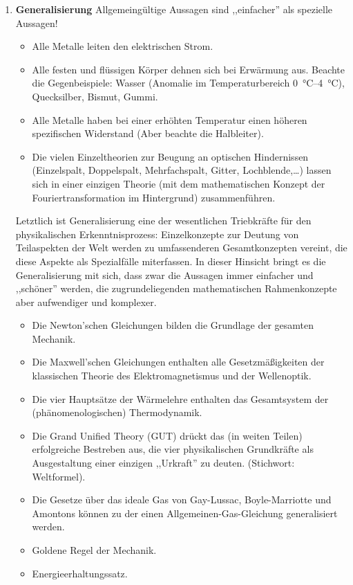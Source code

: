 \begin{enumerate}
	
	\item \textbf{Generalisierung}
	Allgemeing\"{u}ltige Aussagen sind ,,einfacher'' als spezielle Aussagen!
	
	\mip
	\begin{beisp}
	\begin{itemize}
		\item Alle Metalle leiten den elektrischen Strom.
		\item Alle festen und fl\"{u}ssigen K\"{o}rper dehnen sich bei Erw\"{a}rmung aus.
		\nip
		Beachte die Gegenbeispiele: Wasser (Anomalie im Temperaturbereich
		\SIrange{0}{4}{\celsius}), Quecksilber, Bismut, Gummi.
		\item Alle Metalle haben bei einer erh\"{o}hten Temperatur einen h\"{o}heren
		spezifischen Widerstand (Aber beachte die Halbleiter).
		\item
		Die vielen Einzeltheorien zur Beugung an optischen
		Hindernissen (Einzelspalt, Doppelspalt, Mehrfachspalt, Gitter,
		Lochblende,\dots) lassen sich in einer einzigen Theorie
		(mit dem mathematischen Konzept der Fouriertransformation
		im Hintergrund) zusammenf\"{u}hren.
	\end{itemize}
	\end{beisp}

	
	Letztlich ist Generalisierung eine der wesentlichen Triebkr\"{a}fte
	f\"{u}r den physikalischen Erkenntnisprozess: Einzelkonzepte zur Deutung
	von Teilaspekten der Welt werden zu umfassenderen Gesamtkonzepten
	vereint, die diese Aspekte als Spezialf\"{a}lle miterfassen.
	In dieser Hinsicht bringt es die Generalisierung mit sich,
	dass zwar die Aussagen immer einfacher und ,,sch\"{o}ner'' werden,
	die zugrundeliegenden mathematischen Rahmenkonzepte aber
	aufwendiger und komplexer.
	
	\mip
	\begin{beisp}
	\begin{itemize}
		\item Die Newton'schen Gleichungen bilden die Grundlage der gesamten
		Mechanik.
		\item Die Maxwell'schen Gleichungen enthalten alle Gesetzm\"{a}{\ss}igkeiten
		der klassischen Theorie des Elektromagnetismus und der Wellenoptik.
		\item Die vier Haupts\"{a}tze der W\"{a}rmelehre enthalten das
		Gesamtsystem der (ph\"{a}nomenologischen) Thermodynamik.
		\item
		Die Grand Unified Theory (GUT) dr\"{u}ckt das (in weiten Teilen)
		erfolgreiche Bestreben aus, die vier physikalischen Grundkr\"{a}fte
		als Ausgestaltung einer einzigen ,,Urkraft'' zu deuten.
		(Stichwort: Weltformel).
		\item
		Die Gesetze \"{u}ber das ideale Gas von
		Gay-Lussac, Boyle-Marriotte und Amontons k\"{o}nnen zu der einen
		Allgemeinen-Gas-Gleichung generalisiert werden.
		\item
		Goldene Regel der Mechanik.
		\item
		Energieerhaltungssatz.
	\end{itemize}
	\end{beisp}
	

\end{enumerate}
